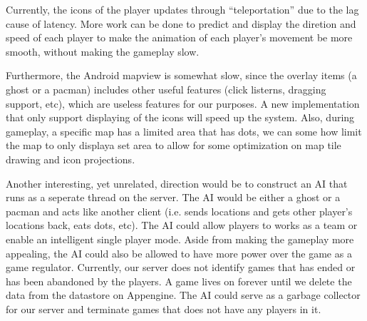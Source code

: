 \documentclass{acm_proc_article-sp}
\begin{document}
Currently, the icons of the player updates through ``teleportation''
due to the lag cause of latency. More work can be done to predict and
display the diretion and speed of each player to make the animation of
each player's movement be more smooth, without making the gameplay
slow.

Furthermore, the Android mapview is somewhat slow, since the overlay
items (a ghost or a pacman) includes other useful features (click
listerns, dragging support, etc), which are useless features for our
purposes. A new implementation that only support displaying of the
icons will speed up the system. Also, during gameplay, a specific map
has a limited area that has dots, we can some how limit the map to
only displaya set area to allow for some optimization on map tile
drawing and icon projections.

Another interesting, yet unrelated, direction would be to construct an
AI that runs as a seperate thread on the server. The AI would be
either a ghost or a pacman and acts like another client (i.e. sends
locations and gets other player's locations back, eats dots, etc). The
AI could allow players to works as a team or enable an intelligent
single player mode. Aside from making the gameplay more appealing, the
AI could also be allowed to have more power over the game as a game
regulator. Currently, our server does not identify games that has
ended or has been abandoned by the players. A game lives on forever
until we delete the data from the datastore on Appengine. The AI could
serve as a garbage collector for our server and terminate games that
does not have any players in it.




\end{document}
